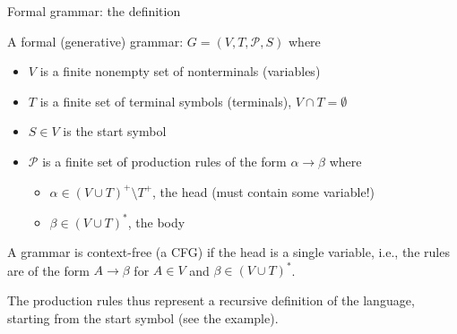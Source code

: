 \documentclass[handout]{beamer}
\begin{document}
\begin{frame}{Formal grammar: the definition}

    A \alert{formal (generative) grammar}: $G=(V,T,\mathcal P,S)$ where
    \begin{itemize}
        \item $V$ is a finite nonempty set of \alert{nonterminals} (\alert{variables})
        \item $T$ is a finite set of \alert{terminal symbols} (\alert{terminals}), $V\cap T=\emptyset$
        \item $S\in V$ is the \alert{start symbol}
        \item $\mathcal P$ is a finite set of \alert{production rules} of the form $\alpha\to\beta$ where 
		\begin{itemize}
			\item $\alpha\in(V\cup T)^+\setminus T^+$, the \alert{head} (must contain some variable!)
			\item $\beta\in(V\cup T)^*$, the \alert{body}
		\end{itemize}
    \end{itemize}

	A grammar is \alert{context-free} (a \alert{CFG}) if the head is a single variable, i.e., the rules are of the form $A\to\beta$ for $A\in V$ and $\beta\in(V\cup T)^*$.
    
	\bigskip

	The production rules thus represent a \alert{recursive definition of the language}, starting from the start symbol (see the example).	 

\end{frame}
\end{document}
